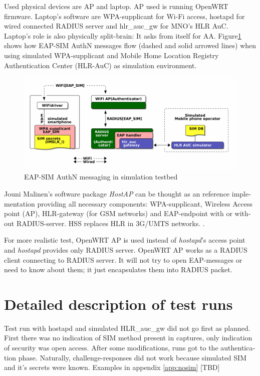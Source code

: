 \documentclass[12pt,a4paper,english]{tutthesis}
\begin{document}
\begin{otherlanguage}{english}
Used physical devices are AP and laptop.  AP used is running OpenWRT
firmware.  Laptop's software are WPA-supplicant for Wi-Fi access,
hostapd for wired connected RADIUS server and hlr\_auc\_gw for MNO's
HLR AuC. Laptop's role is also physically split-brain: It asks from itself for AA. 
Figure\ref{eap-sim-testbed} shows how EAP-SIM AuthN messages flow (dashed
and solid arrowed lines) when using 
simulated WPA-supplicant and Mobile Home Location Registry Authentication Center (HLR-AuC) as simulation environment.

\begin{figure}[htb]
\centering
\includegraphics[width=.9\linewidth]{demoinfra.png}
\caption{\label{eap-sim-testbed}EAP-SIM AuthN messaging in simulation testbed}
\end{figure}




Jouni Malinen's software package \emph{HostAP} can be thought as an reference
implementation providing all necessary components: WPA-supplicant, Wireless
Access point (AP), HLR-gateway (for GSM networks) and EAP-endpoint with
or without RADIUS-server. HSS replaces HLR in 3G/UMTS networks.
\cite{hostapd}.

For more realistic test, OpenWRT AP is used instead of \emph{hostapd}'s
access point and \emph{hostapd} provides only RADIUS server.
OpenWRT AP works as a RADIUS client connecting to RADIUS server. 
It will not try to open EAP-messages or need
to know about them; it just encapsulates them into RADIUS packet.

\section{Detailed description of test runs}
\label{sec-5-2}



Test run with hostapd and simulated HLR\_auc\_gw
did not go first as planned. First there was no indication of SIM method
present in captures, only indication of security was open access.
After some modifications, runs got to the authentication phase.
Naturally, challenge-responses did not work 
because simulated SIM and it's secrets were known. 
Examples in appendix \ref{app:nosim}   [TBD]




\end{otherlanguage}
\end{document}
